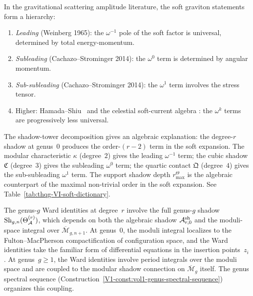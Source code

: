 \begin{remark}
In the gravitational scattering amplitude literature, the soft
graviton statements form a hierarchy:
\begin{enumerate}[label=\textup{(\arabic*)}]
\item \emph{Leading} (Weinberg 1965): the $\omega^{-1}$ pole of
 the soft factor is universal, determined by total energy-momentum.
\item \emph{Subleading} (Cachazo--Strominger 2014): the $\omega^0$
 term is determined by angular momentum.
\item \emph{Sub-subleading} (Cachazo--Strominger 2014): the
 $\omega^1$ term involves the stress tensor.
\item Higher: Hamada--Shiu~\cite{HamadaShiuSubsubSoft} and the
 celestial soft-current algebra
 \cite{GuevaraHimwichPateStrominger21,StromingerWInfinityCelestial}:
 the
 $\omega^k$ terms are progressively less universal.
\end{enumerate}
The shadow-tower decomposition gives an algebraic explanation:
the degree-$r$ shadow at genus~$0$ produces the order-$(r-2)$
term in the soft expansion. The modular characteristic $\kappa$
(degree~$2$) gives the leading $\omega^{-1}$ term; the cubic shadow
$\mathfrak{C}$ (degree~$3$) gives the subleading $\omega^0$ term;
the quartic contact $\mathfrak{Q}$ (degree~$4$) gives the
sub-subleading $\omega^1$ term. The support shadow depth
\(r^\Theta_{\max}\)
is the algebraic counterpart of the maximal non-trivial order in
the soft expansion. See Table~\ref{tab:thqg-VI-soft-dictionary}.
\end{remark}

\begin{remark}
The genus-$g$ Ward identities at degree~$r$ involve the full
genus-$g$ shadow $\operatorname{Sh}_{g,n}(\Theta_{\mathcal{A}}^{(r)})$, which depends on
both the algebraic shadow $\mathcal{A}^{\mathrm{sh}}_{r,0}$ and the
moduli-space integral over $\overline{\mathcal{M}}_{g,n+1}$.
At genus~$0$, the moduli integral localizes to the
Fulton--MacPherson compactification of configuration space, and the
Ward identities take the familiar form of differential equations
in the insertion points~$z_i$.
At genus~$g \geq 1$, the Ward identities involve period integrals
over the moduli space and are coupled to the modular shadow
connection on $\overline{\mathcal{M}}_g$ itself. The genus
spectral sequence
(Construction~\ref{V1-const:vol1-genus-spectral-sequence})
organizes this coupling.
\end{remark}


